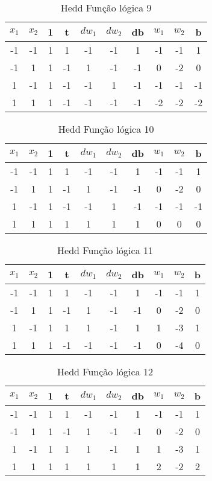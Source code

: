 \begin{table}[H]
\centering
\begin{tabular}{|c|c|c|c|c|c|c|c|c|c|}
\hline
$x_1$ & $x_2$ & 1 & t & $dw_1$ & $dw_2$ & db & $w_1$ & $w_2$ & b \\ \hline
-1 & -1 & 1 & 1 & -1 & -1 & 1 & -1 & -1 & 1\\ \hline
-1 & 1 & 1 & -1 & 1 & -1 & -1 & 0 & -2 & 0\\ \hline
1 & -1 & 1 & -1 & -1 & 1 & -1 & -1 & -1 & -1\\ \hline
1 & 1 & 1 & -1 & -1 & -1 & -1 & -2 & -2 & -2\\ \hline
\end{tabular}
\caption{Hedd Função lógica 9}\label{hedd:9}\end{table}

\begin{table}[H]
\centering
\begin{tabular}{|c|c|c|c|c|c|c|c|c|c|}
\hline
$x_1$ & $x_2$ & 1 & t & $dw_1$ & $dw_2$ & db & $w_1$ & $w_2$ & b \\ \hline
-1 & -1 & 1 & 1 & -1 & -1 & 1 & -1 & -1 & 1\\ \hline
-1 & 1 & 1 & -1 & 1 & -1 & -1 & 0 & -2 & 0\\ \hline
1 & -1 & 1 & -1 & -1 & 1 & -1 & -1 & -1 & -1\\ \hline
1 & 1 & 1 & 1 & 1 & 1 & 1 & 0 & 0 & 0\\ \hline
\end{tabular}
\caption{Hedd Função lógica 10}\label{hedd:10}\end{table}

\begin{table}[H]
\centering
\begin{tabular}{|c|c|c|c|c|c|c|c|c|c|}
\hline
$x_1$ & $x_2$ & 1 & t & $dw_1$ & $dw_2$ & db & $w_1$ & $w_2$ & b \\ \hline
-1 & -1 & 1 & 1 & -1 & -1 & 1 & -1 & -1 & 1\\ \hline
-1 & 1 & 1 & -1 & 1 & -1 & -1 & 0 & -2 & 0\\ \hline
1 & -1 & 1 & 1 & 1 & -1 & 1 & 1 & -3 & 1\\ \hline
1 & 1 & 1 & -1 & -1 & -1 & -1 & 0 & -4 & 0\\ \hline
\end{tabular}
\caption{Hedd Função lógica 11}\label{hedd:11}\end{table}

\begin{table}[H]
\centering
\begin{tabular}{|c|c|c|c|c|c|c|c|c|c|}
\hline
$x_1$ & $x_2$ & 1 & t & $dw_1$ & $dw_2$ & db & $w_1$ & $w_2$ & b \\ \hline
-1 & -1 & 1 & 1 & -1 & -1 & 1 & -1 & -1 & 1\\ \hline
-1 & 1 & 1 & -1 & 1 & -1 & -1 & 0 & -2 & 0\\ \hline
1 & -1 & 1 & 1 & 1 & -1 & 1 & 1 & -3 & 1\\ \hline
1 & 1 & 1 & 1 & 1 & 1 & 1 & 2 & -2 & 2\\ \hline
\end{tabular}
\caption{Hedd Função lógica 12}\label{hedd:12}\end{table}

